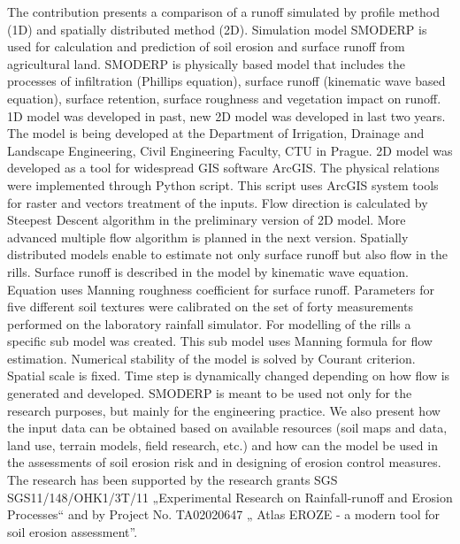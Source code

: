 
The contribution presents a comparison of a runoff simulated by profile method (1D) and spatially distributed method (2D). Simulation model SMODERP is used for calculation and prediction of soil erosion and surface runoff from agricultural land. SMODERP is physically based model that includes the processes of infiltration (Phillips equation), surface runoff (kinematic wave based equation), surface retention, surface roughness and vegetation impact on runoff. 1D model was developed in past, new 2D model was developed in last two years.  The model is being developed at the Department of Irrigation, Drainage and Landscape Engineering, Civil Engineering Faculty, CTU in Prague. 
2D model was developed as a tool for widespread GIS software ArcGIS. The physical relations were implemented through Python script.  This script uses ArcGIS system tools for raster and vectors treatment of the inputs. Flow direction is calculated by Steepest Descent algorithm in the preliminary version of 2D model. More advanced multiple flow algorithm is planned in the next version.
Spatially distributed models enable to estimate not only surface runoff but also flow in the rills. Surface runoff is described in the model by kinematic wave equation. Equation uses Manning roughness coefficient for surface runoff.  Parameters for five different soil textures were calibrated on the set of forty measurements performed on the laboratory rainfall simulator. For modelling of the rills a specific sub model was created. This sub model uses Manning formula for flow estimation.
Numerical stability of the model is solved by Courant criterion. Spatial scale is fixed. Time step is dynamically changed depending on how flow is generated and developed.
SMODERP is meant to be used not only for the research purposes, but mainly for the engineering practice. We also present how the input data can be obtained based on available resources (soil maps and data, land use, terrain models, field research, etc.) and how can the model be used in the assessments of soil erosion risk and in designing of erosion control measures. 
The research has been supported by the research grants SGS SGS11/148/OHK1/3T/11 „Experimental Research on Rainfall-runoff and Erosion Processes“ and by Project No. TA02020647 „ Atlas EROZE - a modern tool for soil erosion assessment”.

